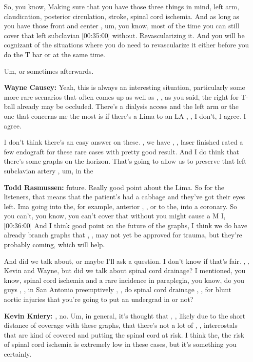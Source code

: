\documentclass[
]{book}
\begin{document}
So, you know, Making sure that you have those three things in mind, left
arm, claudication, posterior circulation, stroke, spinal cord ischemia.
And as long as you have those front and center , um, you know, most of
the time you can still cover that left subclavian {[}00:35:00{]} without.
Revascularizing it. And you will be cognizant of the situations where
you do need to revascularize it either before you do the T bar or at the
same time.

Um, or sometimes afterwards.

\textbf{Wayne Causey:} Yeah, this is always an interesting situation,
particularly some more rare scenarios that often comes up as well as , ,
as you said, the right for T-ball already may be occluded. There's a
dialysis access and the left arm or the one that concerns me the most is
if there's a Lima to an LA , , I don't, I agree. I agree.

I don't think there's an easy answer on these. , we have , , laser
finished rated a few endograft for these rare cases with pretty good
result. And I do think that there's some graphs on the horizon. That's
going to allow us to preserve that left subclavian artery , um, in the

\textbf{Todd Rasmussen:} future. Really good point about the Lima. So for the
listeners, that means that the patient's had a cabbage and they've got
their eyes left. Ima going into the, for example, anterior , , or to
the, into a coronary. So you can't, you know, you can't cover that
without you might cause a M I, {[}00:36:00{]} And I think good point on the
future of the graphs, I think we do have already branch graphs that , ,
may not yet be approved for trauma, but they're probably coming, which
will help.

And did we talk about, or maybe I'll ask a question. I don't know if
that's fair. , , Kevin and Wayne, but did we talk about spinal cord
drainage? I mentioned, you know, spinal cord ischemia and a rare
incidence in paraplegia, you know, do you guys , , in San Antonio
preemptively , , do spinal cord drainage , , for blunt aortic injuries
that you're going to put an undergrad in or not?

\textbf{Kevin Kniery:} , no. Um, in general, it's thought that , , likely due
to the short distance of coverage with these graphs, that there's not a
lot of , , intercostals that are kind of covered and putting the spinal
cord at risk. I think the, the risk of spinal cord ischemia is extremely
low in these cases, but it's something you certainly.
\end{document}
